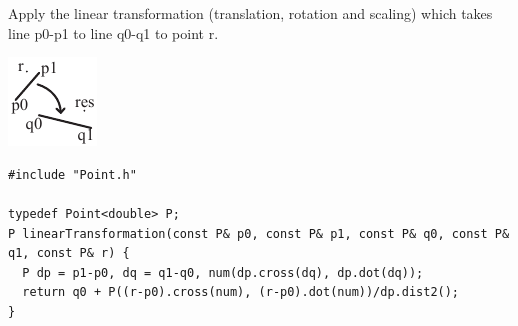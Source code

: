 \begin{minipage}{75mm}
Apply the linear transformation (translation, rotation and scaling) which takes line p0-p1 to line q0-q1 to point r.
\end{minipage}
\begin{minipage}{15mm}
\vspace{-8mm}
\includegraphics[width=\textwidth]{"../code/Geometry/2D Primitive/linearTransformation"}
\vspace{-2mm}
\end{minipage}
\begin{verbatim}
#include "Point.h"

typedef Point<double> P;
P linearTransformation(const P& p0, const P& p1, const P& q0, const P& q1, const P& r) {
  P dp = p1-p0, dq = q1-q0, num(dp.cross(dq), dp.dot(dq));
  return q0 + P((r-p0).cross(num), (r-p0).dot(num))/dp.dist2();
}
\end{verbatim}
